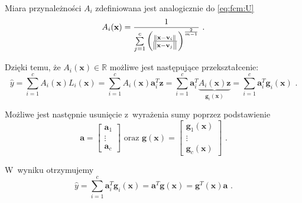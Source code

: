 \documentclass[a4paper; 11pt]{article}
\begin{document}
Miara przynależności $A_i$ zdefiniowana jest analogicznie do \eqref{eq:fcm:U}
\begin{equation}
    A_i(\mathbf{x}) = \frac{1}{\sum\limits_{j=1}^c {
        \left( \frac{
            \norm{\mathbf{x} - \mathbf{v}_i}}{
            \norm{\mathbf{x} - \mathbf{v}_j}} \right)^{
                \frac{2}{m - 1}}}} \text{ .}
    \label{eq:ts:B}
\end{equation}

Dzięki temu, że $A_i(\mathbf{x}) \in \mathbb{R}$ możliwe jest następujące przekształcenie:
\begin{equation}
    \hat{y} = 
    \sum\limits_{i=1}^c {A_i(\mathbf{x}) L_i(\mathbf{x})} =
    \sum\limits_{i=1}^c {A_i(\mathbf{x}) \mathbf{a}_i^T \mathbf{z}} =
    \sum\limits_{i=1}^c \mathbf{a}_i^T \underbrace{A_i(\mathbf{x}) \mathbf{z}}_{\mathbf{g}_i(\mathbf{x})} =
    \sum\limits_{i=1}^c \mathbf{a}_i^T \mathbf{g}_i(\mathbf{x}) \text{ .}
    \label{eq:ts:yhat}
\end{equation}

Możliwe jest następnie usunięcie z~wyrażenia sumy poprzez podstawienie
\begin{equation}
    \mathbf{a} = 
    \begin{bmatrix} 
        \mathbf{a}_1 \\ 
        \vdots \\ 
        \mathbf{a}_c 
    \end{bmatrix}
    \text{ oraz }
    \mathbf{g}(\mathbf{x}) = 
    \begin{bmatrix} 
        \mathbf{g}_1(\mathbf{x}) \\ 
        \vdots \\ 
        \mathbf{g}_c(\mathbf{x}) 
    \end{bmatrix} \text{ .}
    \label{eq:ts:ag}
\end{equation}

W~wyniku otrzymujemy
\begin{equation}
    \hat{y} =
    \sum\limits_{i=1}^c \mathbf{a}_i^T \mathbf{g}_i(\mathbf{x}) =
    \mathbf{a}^T \mathbf{g}(\mathbf{x}) =
    \mathbf{g}^T(\mathbf{x}) \mathbf{a} \text{ .}
    \label{eq:ts:yhatfinal}
\end{equation}
\end{document}
